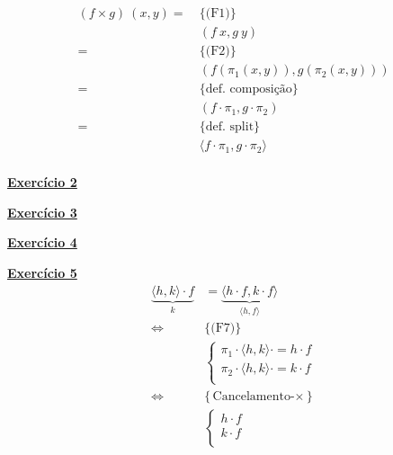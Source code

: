 \documentclass[a4paper,11pt]{article}
\begin{document}
\begin{center}
\begin{minipage}{0.5\textwidth}
	\begin{mdframed}
		\[
		\begin{aligned}
			(f \times g) \  (x, y)
			= \  &\{\text{(F1)}\}\\
			&(f \  x, g \  y) \\
			= \  &\{\text{(F2)}\}\\
			&(f (\pi_1 (x, y)), g (\pi_2 (x, y))) \\
			= \  &\{\text{def. composição}\}\\
			&(f \cdot \pi_1, g \cdot \pi_2) \\
			= \  &\{\text{def. split}\}\\
			&\langle f \cdot \pi_1, g \cdot \pi_2 \rangle \\
		\end{aligned}
		\]
	\end{mdframed}
\end{minipage}
\end{center}


	\noindent \underline{\textbf{Exercício 2}}
	
	
	
	
	\noindent \underline{\textbf{Exercício 3}}
	
	
	
	
	\noindent \underline{\textbf{Exercício 4}}
	
	
	
	\noindent \underline{\textbf{Exercício 5}}
	\[
	\begin{aligned}
		\underbrace{\langle h, k\rangle \cdot f}_{k} &= \underbrace{\langle h \cdot f, k \cdot f \rangle}_{\langle h, f \rangle} \\
		\iff &\{\text{(F7)}\} \\
		&\begin{cases}
			\pi_1 \cdot \langle h, k \rangle \cdot = h \cdot f \\
			\pi_2 \cdot \langle h, k \rangle \cdot = k \cdot f \\
		\end{cases}\\
		\iff &\{\text{Cancelamento-$\times$}\} \\
		&\begin{cases}
			h \cdot f \\
			k \cdot f \\
		\end{cases}
	\end{aligned}
	\]
	
\end{document}

